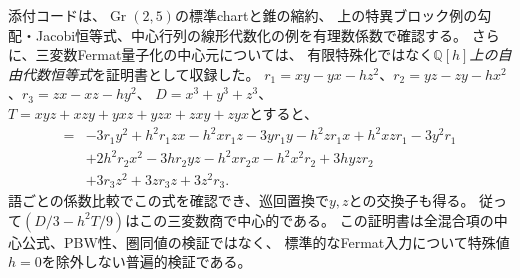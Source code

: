 添付コードは、$\operatorname{Gr}(2,5)$の標準chartと錐の縮約、
上の特異ブロック例の勾配・Jacobi恒等式、中心行列の線形代数化の例を有理数係数で確認する。
さらに、三変数Fermat量子化の中心元については、
有限特殊化ではなく\emph{$\mathbb Q[h]$上の自由代数恒等式}を証明書として収録した。
$r_1=xy-yx-hz^2$、$r_2=yz-zy-hx^2$、$r_3=zx-xz-hy^2$、
$D=x^3+y^3+z^3$、$T=xyz+xzy+yxz+yzx+zxy+zyx$とすると、
\begin{align*}
 [3D-h^2T,x]={}&-3r_1y^2+h^2r_1zx-h^2xr_1z-3yr_1y-h^2zr_1x
 +h^2xzr_1-3y^2r_1\\
 &+2h^2r_2x^2-3hr_2yz-h^2xr_2x-h^2x^2r_2+3hyzr_2\\
 &+3r_3z^2+3zr_3z+3z^2r_3.
\end{align*}
語ごとの係数比較でこの式を確認でき、巡回置換で$y,z$との交換子も得る。
従って$(D/3-h^2T/9)$はこの三変数商で中心的である。
この証明書は全混合項の中心公式、PBW性、圏同値の検証ではなく、
標準的なFermat入力について特殊値$h=0$を除外しない普遍的検証である。
